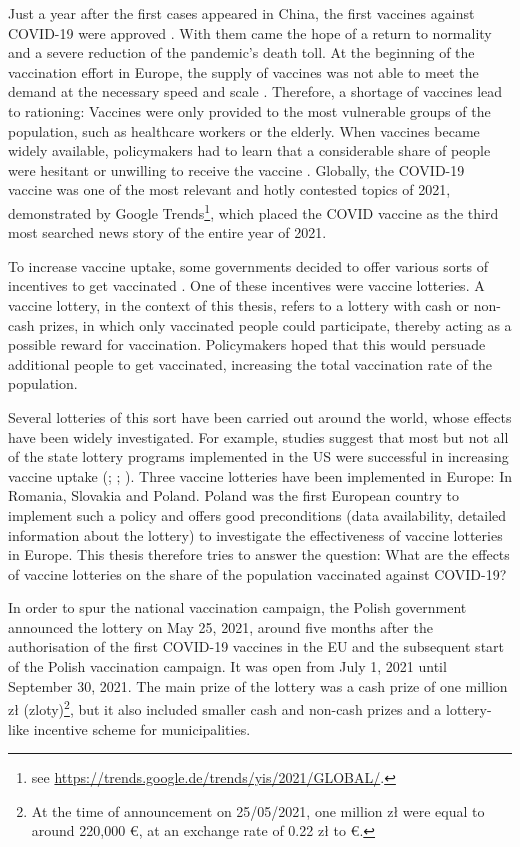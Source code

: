 \documentclass{scrbook}
\begin{document}
Just a year after the first cases appeared in China, the first vaccines
against COVID-19 were approved
\parencite{us_food_and_drug_administration_fda_2020}. With them came the
hope of a return to normality and a severe reduction of the pandemic's
death toll. At the beginning of the vaccination effort in Europe, the
supply of vaccines was not able to meet the demand at the necessary
speed and scale \parencite{bongardt_europes_2021}. Therefore, a shortage
of vaccines lead to rationing: Vaccines were only provided to the most
vulnerable groups of the population, such as healthcare workers or the
elderly. When vaccines became widely available, policymakers had to
learn that a considerable share of people were hesitant or unwilling to
receive the vaccine \parencite{steinert_covid-19_2022}. Globally, the
COVID-19 vaccine was one of the most relevant and hotly contested topics
of 2021, demonstrated by Google
Trends\footnote{see \url{https://trends.google.de/trends/yis/2021/GLOBAL/}.},
which placed the COVID vaccine as the third most searched news story of
the entire year of 2021.

To increase vaccine uptake, some governments decided to offer various
sorts of incentives to get vaccinated \parencite{wyllie_jewellery_2023}.
One of these incentives were vaccine lotteries. A vaccine lottery, in
the context of this thesis, refers to a lottery with cash or non-cash
prizes, in which only vaccinated people could participate, thereby
acting as a possible reward for vaccination. Policymakers hoped that
this would persuade additional people to get vaccinated, increasing the
total vaccination rate of the population.

Several lotteries of this sort have been carried out around the world,
whose effects have been widely investigated. For example, studies
suggest that most but not all of the state lottery programs implemented
in the US were successful in increasing vaccine uptake
(\cite{robertson_are_2021}; \cite{acharya_implementation_2021};
\cite{fuller_assessing_2022}). Three vaccine lotteries have been
implemented in Europe: In Romania, Slovakia and Poland. Poland was the
first European country to implement such a policy and offers good
preconditions (data availability, detailed information about the
lottery) to investigate the effectiveness of vaccine lotteries in
Europe. This thesis therefore tries to answer the question: What are the
effects of vaccine lotteries on the share of the population vaccinated
against COVID-19?

In order to spur the national vaccination campaign, the Polish
government announced the lottery
\parencite{service_of_the_republic_of_poland_national_2021} on May 25,
2021, around five months after the authorisation of the first COVID-19
vaccines in the EU and the subsequent start of the Polish vaccination
campaign. It was open from July 1, 2021 until September 30, 2021. The
main prize of the lottery was a cash prize of one million zł
(zloty)\footnote{At the time of announcement on 25/05/2021, one million zł were equal to around 220,000 €, at an exchange rate of 0.22 zł to €.},
but it also included smaller cash and non-cash prizes and a lottery-like
incentive scheme for municipalities.
\end{document}
